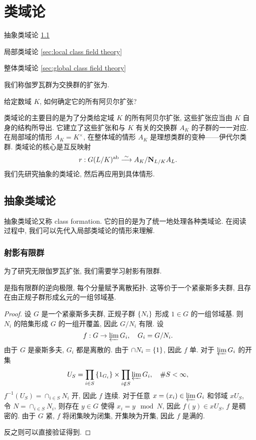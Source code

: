 

\chapter{类域论}
\begin{introduction}
\item 抽象类域论 \ref{sec:abstract class field theory}
\item 局部类域论 \ref{sec:local class field theory}
\item 整体类域论 \ref{sec:global class field theory}
\end{introduction}

我们称伽罗瓦群为交换群的扩张为.
\begin{question}{}{}
给定数域 $K$, 如何确定它的所有阿贝尔扩张?
\end{question}

类域论的主要目的是为了分类给定域 $K$ 的所有阿贝尔扩张, 这些扩张应当由 $K$ 自身的结构所导出. 它建立了这些扩张和与 $K$ 有关的交换群 $A_K$ 的子群的一一对应.
在局部域的情形 $A_K=K^\times$, 在整体域的情形 $A_K$ 是理想类群的变种——伊代尔类群. 类域论的核心是互反映射
  \[r: G(L/K)^{\mathrm{ab}}\stackrel{\sim}{\longrightarrow} A_K/{\mathbf{N}}_{L/K} A_L.\]
我们先研究抽象的类域论, 然后再应用到具体情形.

\section{抽象类域论}
\label{sec:abstract class field theory}
抽象类域论又称 class formation. 它的目的是为了统一地处理各种类域论. 在阅读过程中, 我们可以先代入局部类域论的情形来理解.

\subsection{射影有限群}
为了研究无限伽罗瓦扩张, 我们需要学习射影有限群.
\begin{proposition}{}{}
是指有限群的逆向极限, 每个分量赋予离散拓扑. 这等价于一个紧豪斯多夫群, 且存在由正规子群形成幺元的一组邻域基.
\end{proposition}
\begin{proof}
设 $G$ 是一个紧豪斯多夫群, 正规子群 $\left\{N_i\right\}$ 形成 $1\in G$ 的一组邻域基. 则 $N_i$ 的陪集形成 $G$ 的一组开覆盖, 因此 $G/N_i$ 有限. 设
  \[f:G\to \varprojlim\limits G_i,\quad G_i=G/N_i.\]
由于 $G$ 是豪斯多夫, $G_i$ 都是离散的.
由于 $\cap N_i=\left\{1\right\}$, 因此 $f$ 单.
对于 $\varprojlim\limits G_i$ 的开集 
  \[U_S=\prod_{i\in S}\left\{1_{G_i}\right\} \times  \prod_{i\notin S} \varprojlim\limits G_i,\quad \#S<\infty,\]
$f^{-1}(U_S)=\cap_{i\in S} N_i$ 开, 因此 $f$ 连续.
对于任意 $x=(x_i)\in\varprojlim\limits G_i$ 和邻域 $xU_S$, 令 $N=\cap_{i\in S} N_i$, 则存在 $y\in G$ 使得 $x_i=y\mod N$, 因此 $f(y)\in xU_S$, $f$ 是稠密的. 由于 $G$ 紧, $f$ 将闭集映为闭集, 开集映为开集, 因此 $f$ 是满的.

反之则可以直接验证得到.
\end{proof}

